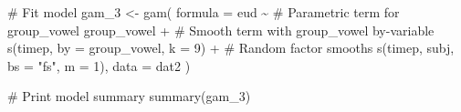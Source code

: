 \documentclass[
  letterpaper,
  DIV=11,
  numbers=noendperiod]{scrartcl}
\newenvironment{Shaded}{\begin{snugshade}}{\end{snugshade}}
\newcommand{\AttributeTok}[1]{\textcolor[rgb]{0.40,0.45,0.13}{#1}}
\newcommand{\CommentTok}[1]{\textcolor[rgb]{0.37,0.37,0.37}{#1}}
\newcommand{\DecValTok}[1]{\textcolor[rgb]{0.68,0.00,0.00}{#1}}
\newcommand{\FunctionTok}[1]{\textcolor[rgb]{0.28,0.35,0.67}{#1}}
\newcommand{\NormalTok}[1]{\textcolor[rgb]{0.00,0.23,0.31}{#1}}
\newcommand{\OtherTok}[1]{\textcolor[rgb]{0.00,0.23,0.31}{#1}}
\newcommand{\SpecialCharTok}[1]{\textcolor[rgb]{0.37,0.37,0.37}{#1}}
\newcommand{\StringTok}[1]{\textcolor[rgb]{0.13,0.47,0.30}{#1}}
\begin{document}
\begin{Shaded}
\begin{Highlighting}[]
\CommentTok{\# Fit model}
\NormalTok{gam\_3 }\OtherTok{\textless{}{-}} \FunctionTok{gam}\NormalTok{(}
  \AttributeTok{formula =}\NormalTok{ eud }\SpecialCharTok{\textasciitilde{}}
    \CommentTok{\# Parametric term for group\_vowel}
\NormalTok{    group\_vowel }\SpecialCharTok{+}
    \CommentTok{\# Smooth term with group\_vowel by{-}variable}
    \FunctionTok{s}\NormalTok{(timep, }\AttributeTok{by =}\NormalTok{ group\_vowel, }\AttributeTok{k =} \DecValTok{9}\NormalTok{) }\SpecialCharTok{+}
    \CommentTok{\# Random factor smooths}
    \FunctionTok{s}\NormalTok{(timep, subj, }\AttributeTok{bs =} \StringTok{"fs"}\NormalTok{, }\AttributeTok{m =} \DecValTok{1}\NormalTok{),}
  \AttributeTok{data =}\NormalTok{ dat2}
\NormalTok{)}
\end{Highlighting}
\end{Shaded}

\begin{Shaded}
\begin{Highlighting}[]
\CommentTok{\# Print model summary}
\FunctionTok{summary}\NormalTok{(gam\_3)}
\end{Highlighting}
\end{Shaded}
\end{document}
